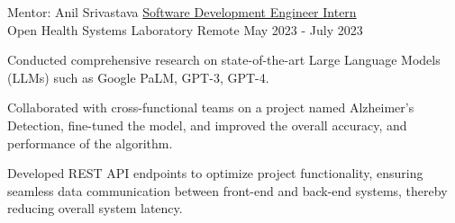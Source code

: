 \begin{cventries}
\cventry
    {Mentor: Anil Srivastava} %
    {\href{https://drive.google.com/file/d/1UGBiStYlawv3WMv9EM6TgvTRaIQakO8b/view?usp=sharing}{Software Development Engineer Intern}\\  {Open Health Systems Laboratory}} %
    {Remote} %
    {May 2023 - July 2023} %
    {
      \begin{cvitems} %
        \item {Conducted comprehensive research on state-of-the-art Large Language Models (LLMs) such as Google PaLM, GPT-3, GPT-4.}
        \item {Collaborated with cross-functional teams on a project named Alzheimer's Detection, fine-tuned the model, and improved the overall accuracy, and performance of the algorithm.}
        \item {Developed REST API endpoints to optimize project functionality, ensuring seamless data communication between front-end and back-end systems, thereby reducing overall system latency.}
      \end{cvitems}
    }
    
\end{cventries}